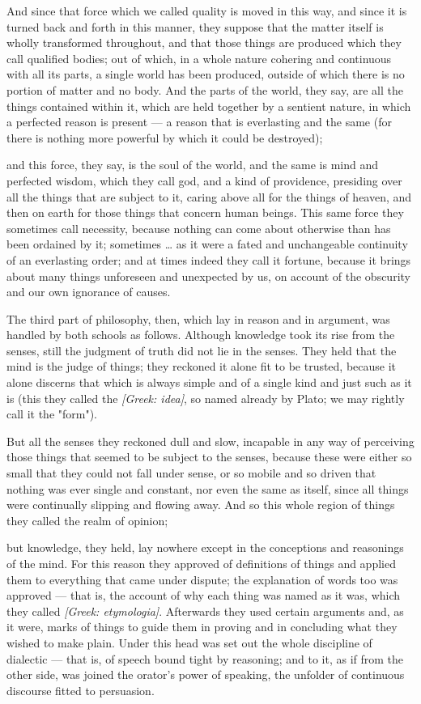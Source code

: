  And since that force which we called quality is moved in this way, and since it is turned back and forth in this manner, they suppose that the matter itself is wholly transformed throughout, and that those things are produced which they call qualified bodies; out of which, in a whole nature cohering and continuous with all its parts, a single world has been produced, outside of which there is no portion of matter and no body. And the parts of the world, they say, are all the things contained within it, which are held together by a sentient nature, in which a perfected reason is present — a reason that is everlasting and the same (for there is nothing more powerful by which it could be destroyed);

 and this force, they say, is the soul of the world, and the same is mind and perfected wisdom, which they call god, and a kind of providence, presiding over all the things that are subject to it, caring above all for the things of heaven, and then on earth for those things that concern human beings. This same force they sometimes call necessity, because nothing can come about otherwise than has been ordained by it; sometimes … as it were a fated and unchangeable continuity of an everlasting order; and at times indeed they call it fortune, because it brings about many things unforeseen and unexpected by us, on account of the obscurity and our own ignorance of causes.

 The third part of philosophy, then, which lay in reason and in argument, was handled by both schools as follows. Although knowledge took its rise from the senses, still the judgment of truth did not lie in the senses. They held that the mind is the judge of things; they reckoned it alone fit to be trusted, because it alone discerns that which is always simple and of a single kind and just such as it is (this they called the \textit{[Greek: idea]}, so named already by Plato; we may rightly call it the "form").

 But all the senses they reckoned dull and slow, incapable in any way of perceiving those things that seemed to be subject to the senses, because these were either so small that they could not fall under sense, or so mobile and so driven that nothing was ever single and constant, nor even the same as itself, since all things were continually slipping and flowing away. And so this whole region of things they called the realm of opinion;

 but knowledge, they held, lay nowhere except in the conceptions and reasonings of the mind. For this reason they approved of definitions of things and applied them to everything that came under dispute; the explanation of words too was approved — that is, the account of why each thing was named as it was, which they called \textit{[Greek: etymologia]}. Afterwards they used certain arguments and, as it were, marks of things to guide them in proving and in concluding what they wished to make plain. Under this head was set out the whole discipline of dialectic — that is, of speech bound tight by reasoning; and to it, as if from the other side, was joined the orator's power of speaking, the unfolder of continuous discourse fitted to persuasion.

